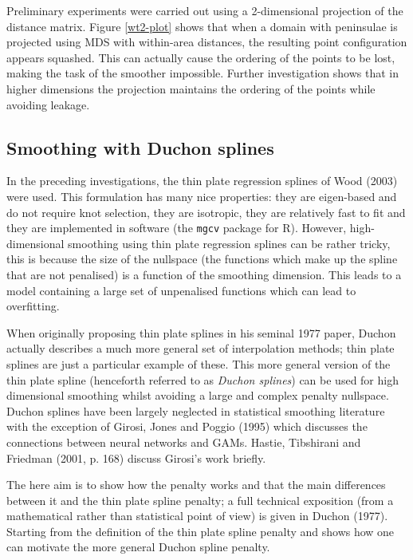 \documentclass[useAMS,referee]{biom}
\begin{document}
Preliminary experiments were carried out using a 2-dimensional projection of the distance matrix. Figure \ref{wt2-plot} shows that when a domain with peninsulae is projected using MDS with within-area distances, the resulting point configuration appears squashed. This can actually cause the ordering of the points to be lost, making the task of the smoother impossible. Further investigation shows that in higher dimensions the projection maintains the ordering of the points while avoiding leakage.

\subsection{Smoothing with Duchon splines}

In the preceding investigations, the thin plate regression splines of Wood (2003) were used. This formulation has many nice properties: they are eigen-based and do not require knot selection, they are isotropic, they are relatively fast to fit and they are implemented in software (the \texttt{mgcv} package for \textsf{R}). However, high-dimensional smoothing using thin plate regression splines can be rather tricky, this is because the size of the nullspace (the functions which make up the spline that are not penalised) is a function of the smoothing dimension. This leads to a model containing a large set of unpenalised functions which can lead to overfitting.

When originally proposing thin plate splines in his seminal 1977 paper, Duchon actually describes a much more general set of interpolation methods; thin plate splines are just a particular example of these. This more general version of the thin plate spline (henceforth referred to as \textit{Duchon splines}) can be used for high dimensional smoothing whilst avoiding a large and complex penalty nullspace. Duchon splines have been largely neglected in statistical smoothing literature with the exception of Girosi, Jones and Poggio (1995) which discusses the connections between neural networks and GAMs. Hastie, Tibshirani and Friedman (2001, p. 168) discuss Girosi's work briefly.

The here aim is to show how the penalty works and that the main differences between it and the thin plate spline penalty; a full technical exposition (from a mathematical rather than statistical point of view) is given in Duchon (1977). Starting from the definition of the thin plate spline penalty and shows how one can motivate the more general Duchon spline penalty. 
\end{document}
